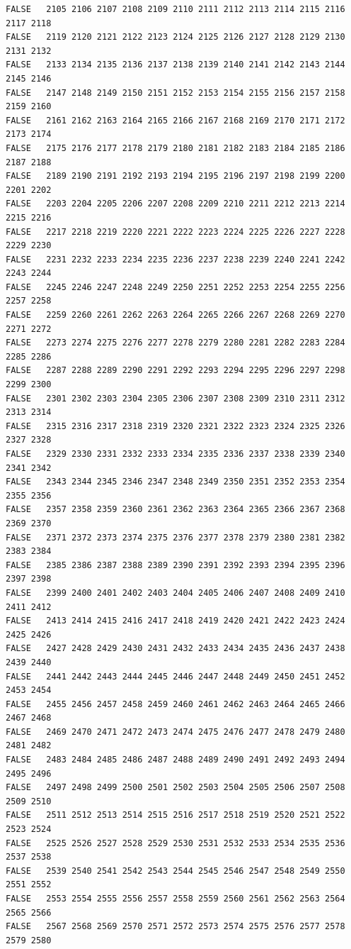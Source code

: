 \documentclass[]{article}
\begin{document}
\begin{verbatim}
FALSE   2105 2106 2107 2108 2109 2110 2111 2112 2113 2114 2115 2116 2117 2118
FALSE   2119 2120 2121 2122 2123 2124 2125 2126 2127 2128 2129 2130 2131 2132
FALSE   2133 2134 2135 2136 2137 2138 2139 2140 2141 2142 2143 2144 2145 2146
FALSE   2147 2148 2149 2150 2151 2152 2153 2154 2155 2156 2157 2158 2159 2160
FALSE   2161 2162 2163 2164 2165 2166 2167 2168 2169 2170 2171 2172 2173 2174
FALSE   2175 2176 2177 2178 2179 2180 2181 2182 2183 2184 2185 2186 2187 2188
FALSE   2189 2190 2191 2192 2193 2194 2195 2196 2197 2198 2199 2200 2201 2202
FALSE   2203 2204 2205 2206 2207 2208 2209 2210 2211 2212 2213 2214 2215 2216
FALSE   2217 2218 2219 2220 2221 2222 2223 2224 2225 2226 2227 2228 2229 2230
FALSE   2231 2232 2233 2234 2235 2236 2237 2238 2239 2240 2241 2242 2243 2244
FALSE   2245 2246 2247 2248 2249 2250 2251 2252 2253 2254 2255 2256 2257 2258
FALSE   2259 2260 2261 2262 2263 2264 2265 2266 2267 2268 2269 2270 2271 2272
FALSE   2273 2274 2275 2276 2277 2278 2279 2280 2281 2282 2283 2284 2285 2286
FALSE   2287 2288 2289 2290 2291 2292 2293 2294 2295 2296 2297 2298 2299 2300
FALSE   2301 2302 2303 2304 2305 2306 2307 2308 2309 2310 2311 2312 2313 2314
FALSE   2315 2316 2317 2318 2319 2320 2321 2322 2323 2324 2325 2326 2327 2328
FALSE   2329 2330 2331 2332 2333 2334 2335 2336 2337 2338 2339 2340 2341 2342
FALSE   2343 2344 2345 2346 2347 2348 2349 2350 2351 2352 2353 2354 2355 2356
FALSE   2357 2358 2359 2360 2361 2362 2363 2364 2365 2366 2367 2368 2369 2370
FALSE   2371 2372 2373 2374 2375 2376 2377 2378 2379 2380 2381 2382 2383 2384
FALSE   2385 2386 2387 2388 2389 2390 2391 2392 2393 2394 2395 2396 2397 2398
FALSE   2399 2400 2401 2402 2403 2404 2405 2406 2407 2408 2409 2410 2411 2412
FALSE   2413 2414 2415 2416 2417 2418 2419 2420 2421 2422 2423 2424 2425 2426
FALSE   2427 2428 2429 2430 2431 2432 2433 2434 2435 2436 2437 2438 2439 2440
FALSE   2441 2442 2443 2444 2445 2446 2447 2448 2449 2450 2451 2452 2453 2454
FALSE   2455 2456 2457 2458 2459 2460 2461 2462 2463 2464 2465 2466 2467 2468
FALSE   2469 2470 2471 2472 2473 2474 2475 2476 2477 2478 2479 2480 2481 2482
FALSE   2483 2484 2485 2486 2487 2488 2489 2490 2491 2492 2493 2494 2495 2496
FALSE   2497 2498 2499 2500 2501 2502 2503 2504 2505 2506 2507 2508 2509 2510
FALSE   2511 2512 2513 2514 2515 2516 2517 2518 2519 2520 2521 2522 2523 2524
FALSE   2525 2526 2527 2528 2529 2530 2531 2532 2533 2534 2535 2536 2537 2538
FALSE   2539 2540 2541 2542 2543 2544 2545 2546 2547 2548 2549 2550 2551 2552
FALSE   2553 2554 2555 2556 2557 2558 2559 2560 2561 2562 2563 2564 2565 2566
FALSE   2567 2568 2569 2570 2571 2572 2573 2574 2575 2576 2577 2578 2579 2580

\end{verbatim}
\end{document}
